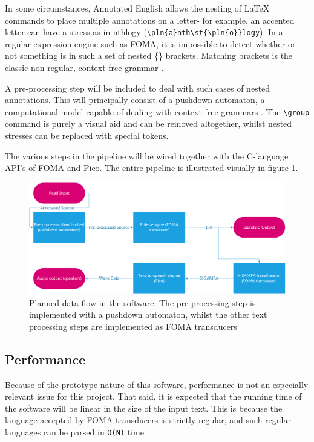 \documentclass[fleqn]{llncs}
\newcommand{\st}[1]{\textsyllabic{#1}}
\newcommand{\pln}[1]{\textvbaraccent{#1}}
\begin{document}
In some circumstances, Annotated English allows the nesting of {\LaTeX} commands to place multiple annotations on a letter- for example, an accented letter can have a stress as in \pln{a}nth\st{\pln{o}}logy (\texttt{{\textbackslash}pln\{a\}nth{\textbackslash}st\{{\textbackslash}pln\{o\}\}logy}). In a regular expression engine such as FOMA, it is impossible to detect whether or not something is in such a set of nested \{\} brackets. Matching brackets is the classic non-regular, context-free grammar \cite{fst}.

A pre-processing step will be included to deal with such cases of nested annotations. This will principally consist of a pushdown automaton, a computational model capable of dealing with context-free grammars \cite{theoryofc}. The \texttt{{\textbackslash}group} command is purely a visual aid and can be removed altogether, whilst nested stresses can be replaced with special tokens.

The various steps in the pipeline will be wired together with the C-language API's of FOMA and Pico. The entire pipeline is illustrated visually in figure \ref{fig:progpipe}.

\begin{figure}[htp]
\includegraphics[width=0.9\linewidth]{data_flow.png}
\caption{Planned data flow in the software. The pre-processing step is implemented with a pushdown automaton, whilst the other text processing steps are implemented as FOMA transducers}
\label{fig:progpipe}
\end{figure}

\subsection{Performance}
Because of the prototype nature of this software, performance is not an especially relevant issue for this project. That said, it is expected that the running time of the software will be linear in the size of the input text. This is because the language accepted by FOMA transducers is strictly regular, and such regular languages can be parsed in \texttt{O(N)} time \cite{theoryofc}.
\end{document}

